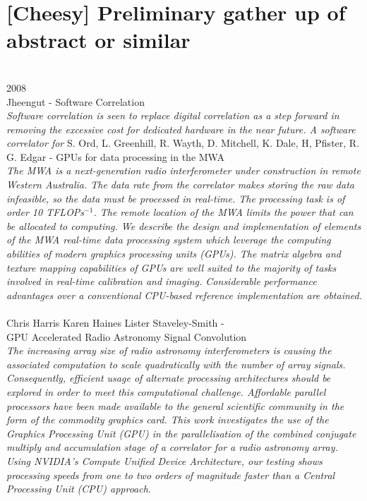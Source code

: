 \section{[Cheesy] Preliminary gather up of abstract or similar}
\hfill\\
{\large 2008}\\ \nocite{jheengut2008MRTsoftcrr}
{\large Jheengut - Software Correlation}\\
\indent
\textit{Software correlation is seen to replace digital correlation as a step forward in removing the excessive cost for dedicated hardware in the near future. A software correlator for}
\noindent
{\large S. Ord, L. Greenhill, R. Wayth, D. Mitchell, K. Dale, H, Pfister, R. G. Edgar - GPUs  for data processing in the MWA}\\
\indent
\textit{The MWA is a next-generation radio interferometer under construction
in remote Western Australia. The data rate from the correlator makes
storing the raw data infeasible, so the data must be processed in real-time. The
processing task is of order 10 TFLOPs$^{-1}$. The remote location of the MWA
limits the power that can be allocated to computing. We describe the design and
implementation of elements of the MWA real-time data processing system which
leverage the computing abilities of modern graphics processing units (GPUs).
The matrix algebra and texture mapping capabilities of GPUs are well suited to
the majority of tasks involved in real-time calibration and imaging. Considerable
performance advantages over a conventional CPU-based reference implementation
are obtained.}
\hfill\\\\
{\large Chris Harris Karen Haines Lister Staveley-Smith - \hfill \\ GPU Accelerated Radio Astronomy Signal Convolution }\\
\indent
\textit{
The increasing array size of radio astronomy interferometers is causing the associated computation to scale quadratically with the number of array signals. Consequently, efficient usage of alternate processing architectures should be explored in order to meet this computational challenge. Affordable parallel processors have been made available to the general scientific community in the form of the commodity graphics card. This work investigates the use of the Graphics Processing Unit (GPU) in the parallelisation of the combined conjugate multiply and accumulation stage of a correlator for a radio astronomy array. Using NVIDIA’s Compute Unified Device Architecture, our testing shows processing speeds from one to two orders of magnitude faster than a Central Processing
Unit (CPU) approach.
}

